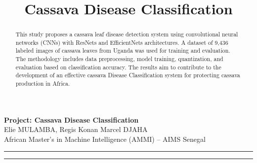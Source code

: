 \documentclass[10pt]{article}
\author{}
\title{Cassava Disease Classification}
\begin{document}
	
	\begin{center}
		{\Large \textbf{Project: Cassava Disease Classification}}\\
		\vspace{1em}
		{\large Elie MULAMBA, Regis Konan Marcel DJAHA}\\
		\vspace{0.5em}
		{African Master's in Machine Intelligence (AMMI) -- AIMS Senegal}
	\end{center}
	

	\begin{center}
		\rule{150mm}{0.2mm}
	\end{center}		

	\begin{abstract}
This study proposes a cassava leaf disease detection system using convolutional neural networks (CNNs) with ResNets and EfficientNets architectures. A dataset of 9,436 labeled images of cassava leaves from Uganda was used for training and evaluation. The methodology includes data preprocessing, model training, quantization, and evaluation based on classification accuracy. The results aim to contribute to the development of an effective cassava Disease Classification system for protecting cassava production in Africa.
\end{abstract}

	\begin{center}
		\rule{150mm}{0.2mm}
	\end{center}		

	\vspace{5mm}
	
\end{document}
